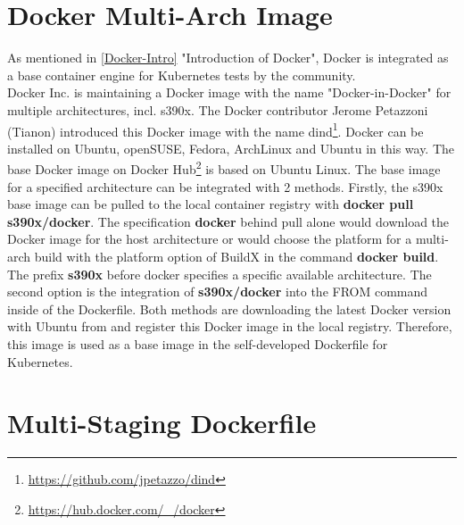 \section{Docker Multi-Arch Image}
As mentioned in \ref{Docker-Intro} "Introduction of Docker", Docker is integrated as a base container engine for Kubernetes tests by the community. \\  
Docker Inc. is maintaining a Docker image with the name "Docker-in-Docker" for multiple architectures, incl. s390x. 
The Docker contributor Jerome Petazzoni (Tianon) introduced this Docker image with the name dind\footnote{\url{https://github.com/jpetazzo/dind}}. Docker can be installed on Ubuntu, openSUSE, Fedora, ArchLinux and Ubuntu in this way.
The base Docker image on Docker Hub\footnote{\url{https://hub.docker.com/_/docker}} is based on Ubuntu Linux.
The base image for a specified architecture can be integrated with 2 methods. Firstly, the s390x base image can be pulled to the local container registry with \textbf{docker pull s390x/docker}. The specification \textbf{docker} behind pull alone would download the Docker image for the host architecture or would choose the platform for a multi-arch build with the platform option of BuildX in the command \textbf{docker build}. The prefix \textbf{s390x} before docker specifies a specific available architecture. 
The second option is the integration of \textbf{s390x/docker} into the FROM command inside of the Dockerfile. Both methods are downloading the latest Docker version with Ubuntu from  and register this Docker image in the local registry.
Therefore, this image is used as a base image in the self-developed Dockerfile for Kubernetes.



\section{Multi-Staging Dockerfile}

